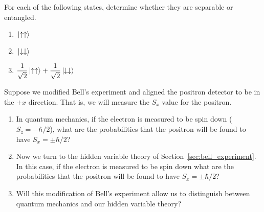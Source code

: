 \begin{problem}
  For each of the following states, determine whether they are
  separable or entangled.
  \begin{enumerate}
  \item $\,|\mbox{$\uparrow\uparrow$}\rangle$
  \item $\,|\mbox{$\downarrow\downarrow$}\rangle$
  \item $\displaystyle\frac{1}{\sqrt{2}}\,|\mbox{$\uparrow\uparrow$}\rangle +
    \frac{1}{\sqrt{2}} \,|\mbox{$\downarrow\downarrow$}\rangle$
  \end{enumerate}
\end{problem}


\begin{problem}
  Suppose we modified Bell's experiment and aligned the positron
  detector to be in the $+x$ direction.  That is, we will measure the
  $S_x$ value for the positron.
  \begin{enumerate}
  \item In quantum mechanics, if the electron is measured to be spin
    down ($S_z=-\hbar/2$), what are the probabilities that the
    positron will be found to have $S_x=\pm\hbar/2$?
  \item Now we turn to the hidden variable theory of
    Section~\ref{sec:bell_experiment}.  In this case, if the electron is
    measured to be spin down what are the probabilities that the
    positron will be found to have $S_x=\pm\hbar/2$?
  \item Will this modification of Bell's experiment allow us to
    distinguish between quantum mechanics and our hidden variable
    theory?
  \end{enumerate}
\end{problem}


\vfill 

\thispagestyle{empty}

